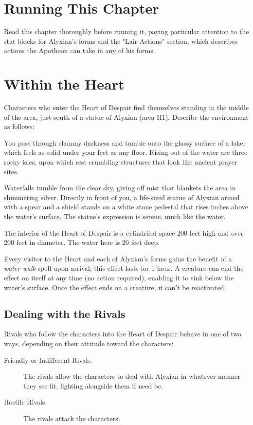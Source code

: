 \documentclass[10pt,a4paper,twoside,bg=print,twocolumn,openany,nodeprecatedcode]{dndbook}
\begin{document}
\section{Running This Chapter}
Read this chapter thoroughly before running it, paying particular attention to the stat blocks for Alyxian's forms and the "Lair Actions" section, which describes actions the Apotheon can take in any of his forms.

\section{Within the Heart}
Characters who enter the Heart of Despair find themselves standing in the middle of the area, just south of a statue of Alyxian (area H1). Describe the environment as follows:

\begin{DndReadAloud}{}
You pass through clammy darkness and tumble onto the glassy surface of a lake, which feels as solid under your feet as any floor. Rising out of the water are three rocky isles, upon which rest crumbling structures that look like ancient prayer sites.

Waterfalls tumble from the clear sky, giving off mist that blankets the area in shimmering silver. Directly in front of you, a life-sized statue of Alyxian armed with a spear and a shield stands on a white stone pedestal that rises inches above the water's surface. The statue's expression is serene, much like the water.

\end{DndReadAloud}

The interior of the Heart of Despair is a cylindrical space 200 feet high and over 200 feet in diameter. The water here is 20 feet deep.

Every visitor to the Heart and each of Alyxian's forms gains the benefit of a \textit{water walk} spell upon arrival; this effect lasts for 1 hour. A creature can end the effect on itself at any time (no action required), enabling it to sink below the water's surface. Once the effect ends on a creature, it can't be reactivated.

\subsection{Dealing with the Rivals}
Rivals who follow the characters into the Heart of Despair behave in one of two ways, depending on their attitude toward the characters:


\begin{description}
\item[Friendly or Indifferent Rivals.]
The rivals allow the characters to deal with Alyxian in whatever manner they see fit, fighting alongside them if need be.
\item[Hostile Rivals.]
The rivals attack the characters.
\end{description}
\end{document}
